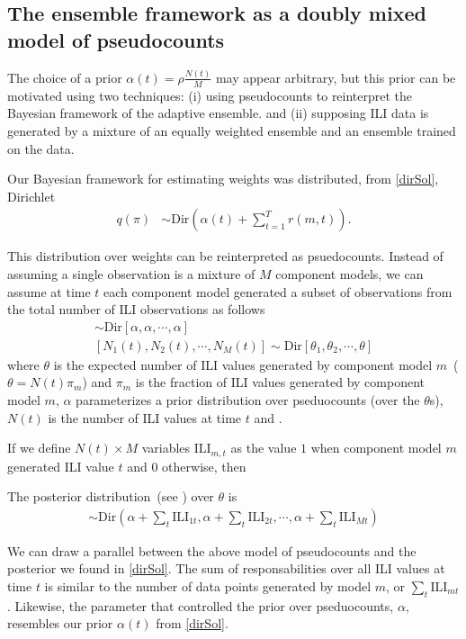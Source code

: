 \documentclass[sagev,times,Review,10pt]{sagej}
\def\l{\left}
\def\r{\right}
\begin{document}
\subsection{The ensemble framework as a doubly mixed model of pseudocounts}

The choice of a prior $\alpha(t) = \rho \frac{N(t)}{M}$ may appear arbitrary, but this prior can be motivated using two techniques: (i) using pseudocounts to reinterpret the Bayesian framework of the adaptive ensemble.  and (ii) supposing ILI data is generated by a mixture of an equally weighted ensemble and an ensemble trained on the data.

Our Bayesian framework for estimating weights was distributed, from \eqref{dirSol}, Dirichlet
\begin{align}
  q(\pi)  &\sim \mathrm{Dir}\l( \alpha(t) + \sum_{t=1}^{T}  r(m,t)  \r).
\end{align}

This distribution over weights can be reinterpreted as psuedocounts.
Instead of assuming a single observation is a mixture of $M$ component models, we can assume at time $t$ each component model generated a subset of observations from the total number of ILI observations as follows 
\begin{align}
  [\theta_{1},\theta_{2},\cdots,\theta_{M}] \sim \text{Dir}\l[ \alpha, \alpha, \cdots, \alpha \r]\\
  [N_{1}(t),N_{2}(t),\cdots,N_{M}(t) ]  \sim \text{Dir} \l[ \theta_{1}, \theta_{2}, \cdots, \theta \r]
\end{align}
where $\theta$ is the expected number of ILI values generated by component model $m$~( $\theta = N(t) \pi_{m}$) and $\pi_{m}$ is the fraction of ILI values generated by component model $m$, $\alpha$ parameterizes a prior distribution over pseduocounts (over the $\theta$s),  $N(t)$ is the number of ILI values at time $t$ and .

If we define $N(t) \times M$ variables $\text{ILI}_{m,t}$ as the value $1$ when component model $m$ generated ILI value $t$ and 0 otherwise, then 

The posterior distribution~(see \cite{bishop2006pattern}) over $\theta$ is
\begin{align}
  [\theta_{1},\theta_{2},\cdots,\theta_{M}] \sim \text{Dir}\l( \alpha + \sum_{t} \text{ILI}_{1t}, \alpha + \sum_{t} \text{ILI}_{2t}, \cdots, \alpha + \sum_{t} \text{ILI}_{Mt}\r) \label{pcounts}
\end{align}

We can draw a parallel between the above model of pseudocounts and the posterior we found in \eqref{dirSol}.
The sum of responsabilities over all ILI values at time $t$ is similar to the number of data points generated by model $m$, or $\sum_{t} \text{ILI}_{mt}$.
Likewise, the parameter that controlled the prior over pseduocounts, $\alpha$, resembles our prior $\alpha(t)$ from \eqref{dirSol}.
\end{document}
